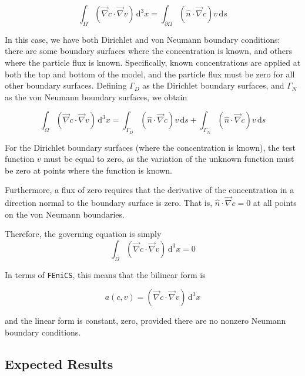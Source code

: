 \begin{equation}
  \int_{\Omega} \left( \vec{\nabla}c \cdot \vec{\nabla}v \right) \,\mathrm{d}^3x =
  \int_{\partial\Omega} \left( \hat{n} \cdot \vec{\nabla} c \right) v\,\mathrm{d}s
\end{equation}

In this case, we have both Dirichlet and von Neumann boundary conditions:
there are some boundary surfaces where the concentration is known,
and others where the particle flux is known.
Specifically, known concentrations are applied at both the top and bottom of the model,
and the particle flux must be zero for all other boundary surfaces.
Defining $\Gamma_D$ as the Dirichlet boundary surfaces,
and $\Gamma_N$ as the von Neumann boundary surfaces, we obtain

\begin{equation}
  \int_{\Omega} \left( \vec{\nabla}c \cdot \vec{\nabla}v \right) \,\mathrm{d}^3x =
  \int_{\Gamma_D} \left( \hat{n} \cdot \vec{\nabla} c \right) v\,\mathrm{d}s
  +\int_{\Gamma_N} \left( \hat{n} \cdot \vec{\nabla} c \right) v\,\mathrm{d}s
\end{equation}

For the Dirichlet boundary surfaces (where the concentration is known),
the test function $v$ must be equal to zero,
as the variation of the unknown function must be zero at points where the function is known.

Furthermore, a flux of zero requires that the derivative of the concentration in a direction
normal to the boundary surface is zero.
That is, $\hat{n} \cdot \vec{\nabla} c = 0$ at all points on the von Neumann boundaries.

Therefore, the governing equation is simply
\begin{equation}
  \int_{\Omega} \left( \vec{\nabla}c \cdot \vec{\nabla}v \right) \,\mathrm{d}^3x = 0
\end{equation}

In terms of \texttt{FEniCS}, this means that the bilinear form is

\begin{equation}
  \boxed{
    a(c,v)=\left( \vec{\nabla}c \cdot \vec{\nabla}v \right) \,\mathrm{d}^3x
  }
\end{equation}

and the linear form is constant, zero, provided there are no nonzero Neumann boundary conditions.

\subsection{Expected Results}\label{subsec:unhom_fick_expected}

